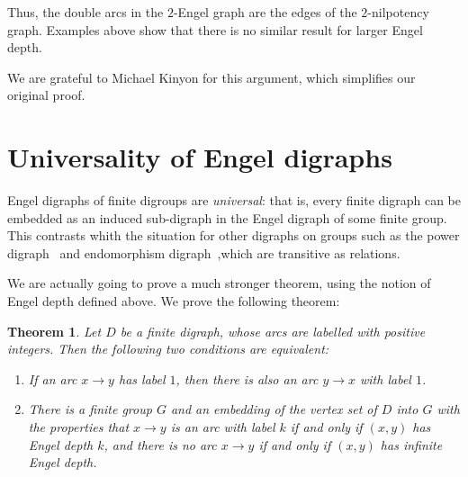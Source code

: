 \documentclass[reqno,12pt]{amsart}
\theoremstyle{plain}
\newtheorem{thm}{Theorem}[section]
\theoremstyle{definition}
\begin{document}
Thus, the double arcs in the $2$-Engel graph are the edges of the
$2$-nilpotency graph. Examples above show that there is no similar result for
larger Engel depth.

We are grateful to Michael Kinyon for this argument, which simplifies
our original proof.

\section{Universality of Engel digraphs}

Engel digraphs of finite digroups are \emph{universal}: that is, every finite
digraph can be embedded as an induced sub-digraph in the Engel digraph of
some finite group. This contrasts whith the situation for other digraphs on
groups such as the power digraph~\cite{kq} and endomorphism digraph~\cite{acgl},which are transitive as relations.

We are actually going to prove a much stronger theorem, using the notion of
Engel depth defined above. We prove the following theorem:

\begin{thm}
Let $D$ be a finite digraph, whose arcs are labelled with positive integers.
Then the following two conditions are equivalent:
\begin{enumerate}
\item If an arc $x\to y$ has label $1$, then there is also an arc $y\to x$
with label $1$.
\item There is a finite group $G$ and an embedding of the vertex set of
$D$ into $G$ with the properties that $x\to y$ is an arc with label $k$ if
and only if $(x,y)$ has Engel depth $k$, and there is no arc $x\to y$ if and
only if $(x,y)$ has infinite Engel depth.
\end{enumerate}
\end{thm}
\end{document}
